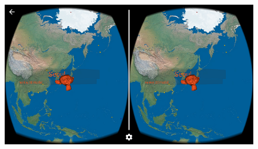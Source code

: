 \begin{figure}[H]
	\centering
	\includegraphics[width=\linewidth, keepaspectratio]{Figures/Screenshots/placemark-obj-2.png}
	\decoRule
\end{figure}


